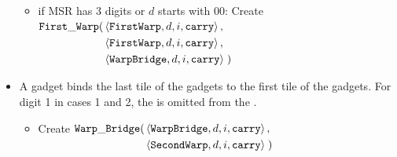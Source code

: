 \begin{itemize}
\begin{itemize}
                \item if MSR has 3 digits or $d$ starts with 00: Create
                $\begin{aligned}[t]
                    {\tt First\_Warp}(& \left\langle {\tt FirstWarp}, d, i, {\tt carry} \right\rangle, \\
                               & \left\langle {\tt FirstWarp}, d, i, {\tt carry} \right\rangle, \\
                               & \left\langle {\tt WarpBridge}, d, i, {\tt carry} \right\rangle \;)
                \end{aligned}$

            \end{itemize}
            \vspace{.5cm}

            \item A {\warpbridge} gadget binds the last tile of the {\firstwarp} gadgets to the
            first tile of the {\secondwarp} gadgets. For digit 1 in cases 1 and 2, the
            {\warpbridge} is omitted from the {\warpunit}.

            \begin{itemize}
                \item Create
                $\begin{aligned}[t]
                    {\tt Warp\_Bridge}(& \left\langle {\tt WarpBridge}, d, i, {\tt carry} \right\rangle, \\
                                & \left\langle {\tt SecondWarp}, d, i, {\tt carry} \right\rangle \;)
                \end{aligned}$
                \vspace{.5cm}
            \end{itemize}


\end{itemize}
